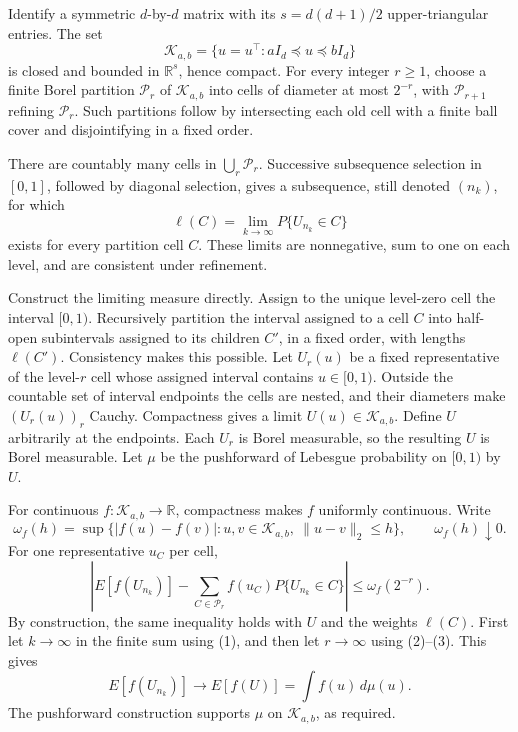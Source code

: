 Identify a symmetric \(d\)-by-\(d\) matrix with its \(s=d(d+1)/2\) upper-triangular entries.  The set
\[
 \mathcal K_{a,b}=\{u=u^\top:aI_d\preceq u\preceq bI_d\}
\]
is closed and bounded in \(\mathbb R^s\), hence compact.  For every integer \(r\ge1\), choose a finite Borel partition \(\mathcal P_r\) of \(\mathcal K_{a,b}\) into cells of diameter at most \(2^{-r}\), with \(\mathcal P_{r+1}\) refining \(\mathcal P_r\).  Such partitions follow by intersecting each old cell with a finite ball cover and disjointifying in a fixed order.

There are countably many cells in \(\bigcup_r\mathcal P_r\).  Successive subsequence selection in \([0,1]\), followed by diagonal selection, gives a subsequence, still denoted \((n_k)\), for which
\[
 \ell(C)=\lim_{k\to\infty}P\{U_{n_k}\in C\}
\tag{1}
\]
exists for every partition cell \(C\).  These limits are nonnegative, sum to one on each level, and are consistent under refinement.

Construct the limiting measure directly.  Assign to the unique level-zero cell the interval \([0,1)\).  Recursively partition the interval assigned to a cell \(C\) into half-open subintervals assigned to its children \(C'\), in a fixed order, with lengths \(\ell(C')\).  Consistency makes this possible.  Let \(U_r(u)\) be a fixed representative of the level-\(r\) cell whose assigned interval contains \(u\in[0,1)\).  Outside the countable set of interval endpoints the cells are nested, and their diameters make \((U_r(u))_r\) Cauchy.  Compactness gives a limit \(U(u)\in\mathcal K_{a,b}\).  Define \(U\) arbitrarily at the endpoints.  Each \(U_r\) is Borel measurable, so the resulting \(U\) is Borel measurable.  Let \(\mu\) be the pushforward of Lebesgue probability on \([0,1)\) by \(U\).

For continuous \(f:\mathcal K_{a,b}\to\mathbb R\), compactness makes \(f\) uniformly continuous.  Write
\[
 \omega_f(h)=\sup\{|f(u)-f(v)|:u,v\in\mathcal K_{a,b},\
 \|u-v\|_2\le h\},\qquad \omega_f(h)\downarrow0.
\tag{2}
\]
For one representative \(u_C\) per cell,
\[
 \left|E[f(U_{n_k})]-\sum_{C\in\mathcal P_r}
 f(u_C)P\{U_{n_k}\in C\}\right|\le\omega_f(2^{-r}).
\tag{3}
\]
By construction, the same inequality holds with \(U\) and the weights \(\ell(C)\).  First let \(k\to\infty\) in the finite sum using (1), and then let \(r\to\infty\) using (2)--(3).  This gives
\[
 E[f(U_{n_k})]\longrightarrow E[f(U)]=\int f(u)\,d\mu(u).
\]
The pushforward construction supports \(\mu\) on \(\mathcal K_{a,b}\), as required.